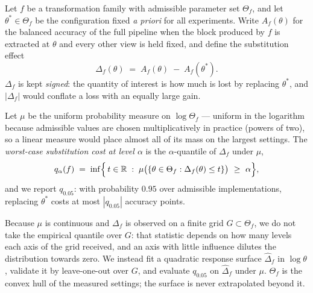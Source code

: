 
Let $f$ be a transformation family with admissible parameter set
$\Theta_f$, and let $\theta^{\ast}\in\Theta_f$ be the configuration fixed
\emph{a priori} for all experiments.  Write $A_f(\theta)$ for the balanced
accuracy of the full pipeline when the block produced by $f$ is extracted at
$\theta$ and every other view is held fixed, and define the substitution
effect
%
\begin{equation}
  \Delta_f(\theta) \;=\; A_f(\theta) \;-\; A_f(\theta^{\ast}).
\end{equation}
%
$\Delta_f$ is kept \emph{signed}: the quantity of interest is how much is
lost by replacing $\theta^{\ast}$, and $|\Delta_f|$ would conflate a loss
with an equally large gain.

Let $\mu$ be the uniform probability measure on $\log\Theta_f$ --- uniform in
the logarithm because admissible values are chosen multiplicatively in
practice (powers of two), so a linear measure would place almost all of its
mass on the largest settings.  The \emph{worst-case substitution cost at
level $\alpha$} is the $\alpha$-quantile of $\Delta_f$ under $\mu$,
%
\begin{equation}
  q_\alpha(f) \;=\; \inf\Bigl\{\,t\in\mathbb{R} \;:\;
    \mu\bigl(\{\theta\in\Theta_f : \Delta_f(\theta)\le t\}\bigr)\ \ge\ \alpha \Bigr\},
\end{equation}
%
and we report $q_{0.05}$: with probability $0.95$ over admissible
implementations, replacing $\theta^{\ast}$ costs at most $|q_{0.05}|$
accuracy points.

Because $\mu$ is continuous and $\Delta_f$ is observed on a finite grid
$G\subset\Theta_f$, we do not take the empirical quantile over $G$: that
statistic depends on how many levels each axis of the grid received, and an
axis with little influence dilutes the distribution towards zero.  We
instead fit a quadratic response surface $\hat{\Delta}_f$ in
$\log\theta$, validate it by leave-one-out over $G$, and evaluate
$q_{0.05}$ on $\hat{\Delta}_f$ under $\mu$.  $\Theta_f$ is the convex hull
of the measured settings; the surface is never extrapolated beyond it.

